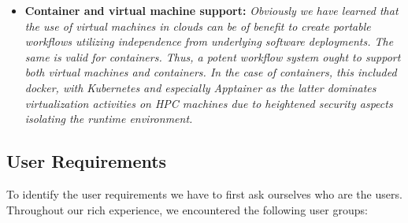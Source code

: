 \documentclass[utf8]{FrontiersinVancouver} %
\begin{document}
\begin{BOX}
\begin{itemize}
{     integrated into the scientific research and benchmark efforts.}
 \item {\bf Container and virtual machine support:} {\it Obviously we
     have learned that the use of virtual machines in clouds can be of
     benefit to create portable workflows utilizing independence from underlying software deployments. The same is
     valid for containers. Thus, a potent workflow system ought to
     support both virtual machines and containers. In the case of
     containers, this included docker, with Kubernetes and especially Apptainer as the latter
     dominates virtualization activities on HPC machines due to heightened security aspects
     isolating the runtime environment. }
  \end{itemize}
\end{BOX}

\subsection{User Requirements}
\label{sec:user-requirements}

To identify the user requirements we have to first ask ourselves who are the users. Throughout our rich experience, we encountered the following user groups:
\end{document}
